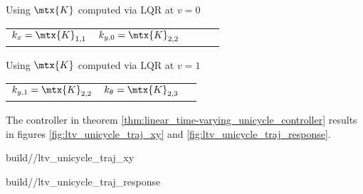 \begin{theorem}
  Using $\mtx{K}$ computed via LQR at $v = 0$
  \begin{figurekey}
    \begin{tabular}{lllll}
      $k_x = \mtx{K}_{1, 1}$ & $k_{y, 0} = \mtx{K}_{2, 2}$
    \end{tabular}
  \end{figurekey}

  Using $\mtx{K}$ computed via LQR at $v = 1$
  \begin{figurekey}
    \begin{tabular}{lll}
        $k_{y, 1} = \mtx{K}_{2, 2}$ & $k_{\theta} = \mtx{K}_{2, 3}$
    \end{tabular}
  \end{figurekey}
\end{theorem}

The controller in theorem \ref{thm:linear_time-varying_unicycle_controller}
results in figures \ref{fig:ltv_unicycle_traj_xy} and
\ref{fig:ltv_unicycle_traj_response}.
\begin{bookfigure}
  \begin{minisvg}{2}{build/\chapterpath/ltv_unicycle_traj_xy}
    \caption{Linear time-varying unicycle controller x-y plot}
    \label{fig:ltv_unicycle_traj_xy}
  \end{minisvg}
  \hfill
  \begin{minisvg}{2}{build/\chapterpath/ltv_unicycle_traj_response}
    \caption{Linear time-varying unicycle controller response}
    \label{fig:ltv_unicycle_traj_response}
  \end{minisvg}
\end{bookfigure}
